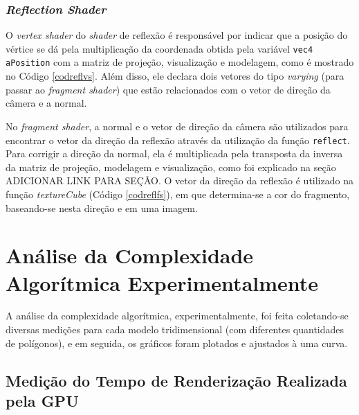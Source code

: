 	
	
\subsubsection{\textit{Reflection Shader}}

	O \textit{vertex shader} do \textit{shader} de reflexão é responsável por indicar que a posição do vértice se dá pela multiplicação da coordenada obtida pela variável \texttt{vec4 aPosition} com a matriz de projeção, visualização e modelagem, como é mostrado no Código \ref{codreflvs}. Além disso, ele declara dois vetores do tipo \textit{varying} (para passar ao \textit{fragment shader}) que estão relacionados com o vetor de direção da câmera e a normal. 

	

	No \textit{fragment shader}, a normal e o vetor de direção da câmera são utilizados para encontrar o vetor da direção da reflexão através da utilização da função \texttt{reflect}. Para corrigir a direção da normal, ela é multiplicada pela transposta da inversa da matriz de projeção, modelagem e visualização, como foi explicado na seção ADICIONAR LINK PARA SEÇÃO. O vetor da direção da reflexão é utilizado na função \textit{textureCube} (Código \ref{codreflfs}), em que determina-se a cor do fragmento, baseando-se nesta direção e em uma imagem. 

	

\section{Análise da Complexidade Algorítmica Experimentalmente}

	A análise da complexidade algorítmica, experimentalmente, foi feita coletando-se diversas medições para cada modelo tridimensional (com diferentes quantidades de polígonos), e em seguida, os gráficos foram plotados e ajustados à uma curva.  

\subsection{Medição do Tempo de Renderização Realizada pela GPU}
\label{gpu}

